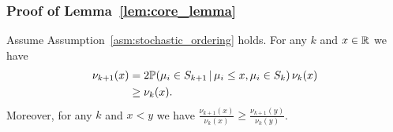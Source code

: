 \subsubsection{Proof of Lemma~\ref{lem:core_lemma}} \label{sec:core_lemma_proof}
\begin{lemma}
Assume Assumption~\ref{asm:stochastic_ordering} holds.
For any $k$ and $x\in \R$ we have
\begin{align*}
\nu_{k+1}(x) &= 2 \P( \mu_i \in S_{k+1} \, | \, \mu_i \leq x, \mu_i \in S_{k} ) \, \nu_k(x)\\
&\geq \nu_k(x).
\end{align*}
Moreover, for any $k$ and $x < y$ we have $\frac{\nu_{k+1}(x)}{\nu_k(x)} \geq \frac{\nu_{k+1}(y)}{\nu_k(y)}$.
\end{lemma} 
